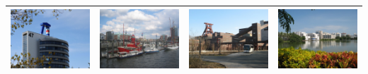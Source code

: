 \begin{small}
\begin{center}
\begin{longtable}{|c|c|c|c|}
 \hyperref[sec:TUKL]{\includegraphics[keepaspectratio,width=9em,height=6em]{NorNet-Configuration-Images/Universitaet_Kaiserslautern.jpeg}} & \hyperref[sec:HAW]{\includegraphics[keepaspectratio,width=9em,height=6em]{NorNet-Configuration-Images/Hochschule_Hamburg.jpeg}} & \hyperref[sec:UDE]{\includegraphics[keepaspectratio,width=9em,height=6em]{NorNet-Configuration-Images/Universitaet_Duisburg-Essen.jpeg}} & \hyperref[sec:HU]{\includegraphics[keepaspectratio,width=9em,height=6em]{NorNet-Configuration-Images/Hainan_University.jpeg}} \\ \hline

\end{longtable}
\end{center}
\end{small}
